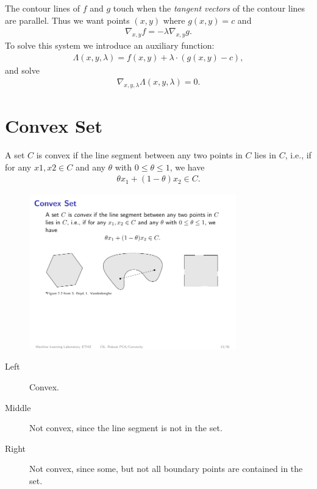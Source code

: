 The contour lines of $f$ and $g$ touch when the \emph{tangent vectors} of the contour lines are parallel.  Thus we want points $(x,y)$ where $g(x,y)=c$ and
\begin{align*}
    \nabla_{x,y} f= -\lambda \nabla_{x,y} g.
\end{align*}
To solve this system we introduce an auxiliary function:
\begin{align*}
    \Lambda(x,y,\lambda) = f(x,y)+\lambda\cdot (g(x,y)-c),
\end{align*}
and solve
\begin{align*}
    \nabla_{x,y,\lambda} \Lambda(x,y,\lambda) = 0.
\end{align*}

\section{Convex Set}
A set $C$ is convex if the line segment between any two points in $C$ lies in $C$, i.e., if for any $x1,x2 \in C$ and any $\theta$ with $0 \leq \theta\leq 1$, we have
\begin{align*}
    \theta x_1 + (1-\theta)x_2 \in C.
\end{align*}
\begin{figure}[H]
\centering
\includegraphics[width=0.8\textwidth]{img/convex_set}
\end{figure}
\begin{description}
\item[Left] Convex.
\item[Middle] Not convex, since the line segment is not in the set.
\item[Right] Not convex, since some, but not all boundary points are contained in the set.
\end{description}

